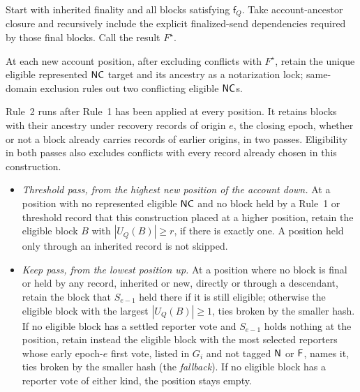 Start with inherited finality and all blocks satisfying $\mathsf{f}_Q$. Take account-ancestor closure and recursively include the explicit finalized-send dependencies required by those final blocks. Call the result $F^\star$.

At each new account position, after excluding conflicts with $F^\star$, retain the unique eligible represented $\mathsf{NC}$ target and its ancestry as a notarization lock; same-domain exclusion rules out two conflicting eligible $\mathsf{NC}$s.

Rule~2 runs after Rule~1 has been applied at every position. It retains blocks with their ancestry under recovery records of origin $e$, the closing epoch, whether or not a block already carries records of earlier origins, in two passes. Eligibility in both passes also excludes conflicts with every record already chosen in this construction.
\begin{itemize}
\item \emph{Threshold pass, from the highest new position of the account down.} At a position with no represented eligible $\mathsf{NC}$ and no block held by a Rule~1 or threshold record that this construction placed at a higher position, retain the eligible block $B$ with $|U_Q(B)|\ge r$, if there is exactly one. A position held only through an inherited record is not skipped.
\item \emph{Keep pass, from the lowest position up.} At a position where no block is final or held by any record, inherited or new, directly or through a descendant, retain the block that $S_{e-1}$ held there if it is still eligible; otherwise the eligible block with the largest $|U_Q(B)|\ge1$, ties broken by the smaller hash. If no eligible block has a settled reporter vote and $S_{e-1}$ holds nothing at the position, retain instead the eligible block with the most selected reporters whose early epoch-$e$ first vote, listed in $G_i$ and not tagged $\mathsf{N}$ or $\mathsf{F}$, names it, ties broken by the smaller hash (the \emph{fallback}). If no eligible block has a reporter vote of either kind, the position stays empty.
\end{itemize}
